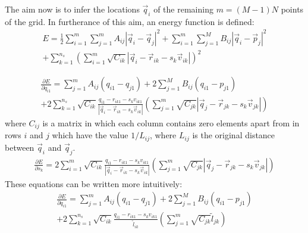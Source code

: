 \documentclass{article}
\begin{document}
The aim now is to infer the locations $\vec{q}_i$ of the remaining
$m=(M-1)N$ points of the grid.  In furtherance of this aim, an energy
function is defined:
\begin{equation}
  \begin{split}
    E = \frac{1}{2} \sum_{i=1}^m \sum_{j=1}^m A_{ij} |\vec{q}_i -
    \vec{q}_j|^2
    +  \sum_{i=1}^m \sum_{j=1}^M B_{ij} |\vec{q}_i -
    \vec{p}_j|^2 \\
    + \sum_{k=1}^{n_s} \left(\sum_{i=1}^m  \sqrt{C_{ik}}|\vec{q}_i -
      \vec{r}_{ik} - s_k\vec{v}_{ik}|
    \right)^2
  \end{split}
\end{equation}

\begin{equation}
  \begin{split}
  \frac{\partial E}{\partial q_{i1}} = 
  \sum_{j=1}^m A_{ij} (q_{i1} - q_{j1}) 
  + 2\sum_{j=1}^M B_{ij} (q_{i1} - p_{j1})  \\
  +  2\sum_{k=1}^{n_s} \sqrt{C_{ik}}\frac{q_{i1}-r_{ik1}-s_kv_{ik1}}{|\vec{q}_i -
      \vec{r}_{ik} - s_k\vec{v}_{ik}|}
  \left(\sum_{j=1}^m  \sqrt{C_{jk}}|\vec{q}_j -
      \vec{r}_{jk} - s_k\vec{v}_{jk}|
    \right)
  \end{split}
\end{equation}
where $C_{ij}$ is a matrix in which each column contains zero elements
apart from in rows $i$ and $j$ which have the value $1/L_{ij}$, where
$L_{ij}$ is the original distance between $\vec{q}_i$ and $\vec{q}_j$.
\begin{equation}
  \begin{split}
  \frac{\partial E}{\partial s_k} = 
  2\sum_{i=1}^m\sqrt{C_{ik}}\frac{q_{i1}-r_{ik1}-s_kv_{ik1}}{|\vec{q}_i -
      \vec{r}_{ik} - s_k\vec{v}_{ik}|}
  \left(\sum_{j=1}^m  \sqrt{C_{jk}}|\vec{q}_j -
      \vec{r}_{jk} - s_k\vec{v}_{jk}|
    \right)
  \end{split}
\end{equation}
These equations can be written more intuitively:
\begin{equation}
  \begin{split}
  \frac{\partial E}{\partial q_{i1}} = 
  \sum_{j=1}^m A_{ij} (q_{i1} - q_{j1}) 
  + 2\sum_{j=1}^M B_{ij} (q_{i1} - p_{j1})  \\
  +  2\sum_{k=1}^{n_s}
  \sqrt{C_{ik}}\frac{q_{i1}-r_{ik1}-s_kv_{ik1}}{\tilde l_{ik}}
  \left(\sum_{j=1}^m  \sqrt{C_{jk}} \tilde l_{jk}
    \right)
  \end{split}
\end{equation}
\end{document}
